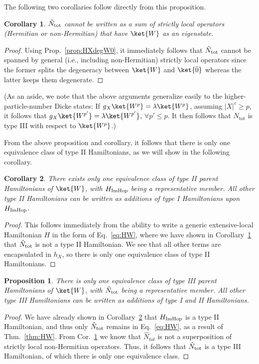 \documentclass[prx,letterpaper,aps,superscriptaddress,floatfix,twocolumn,nofootinbib]{revtex4-2}
\newtheorem{prop}{Proposition}
\newtheorem{cor}{Corollary}
\theoremstyle{definition}
\begin{document}
%
The following two corollaries follow directly from this proposition.
\begin{cor}
    $\hat{N}_{\rm tot}$ cannot be written as a sum of strictly local operators (Hermitian or non-Hermitian) that have $\ket{W}$ as an eigenstate.
\label{cor:Ntotnotnonherm}
\end{cor}
\begin{proof}
    Using Prop.~\ref{prop:HXdegW0}, it immediately follows that $\hat{N}_{\rm tot}$ cannot be spanned by general (i.e., including non-Hermitian) strictly local operators since the former splits the degeneracy between $\ket{W}$ and $\ket{\bar{0}}$ whereas the latter keeps them degenerate.
\end{proof}
%
(As an aside, we note that the above arguments generalize easily to the higher-particle-number Dicke states:
If $g_X \ket{W^p} = \lambda \ket{W^p}$, assuming $|X|^c \geq p$, it follows that $g_X \ket{W^{p'}} = \lambda \ket{W^{p'}}$, $\forall p' \leq p$.
It then follows that $N_{\text{tot}}$ is type III with respect to $\ket{W^p}$.)

%
From the above proposition and corollary, it follows that there is only one equivalence class of type II Hamiltonians, as we will show in the following corollary.
\begin{cor}
    There exists only one equivalence class of type II parent Hamiltonians of $\ket{W}$, 
    with $H_{\rm ImHop}$ being a representative member. All other type II Hamiltonians can be written as additions of type I Hamiltonians upon $H_{\rm ImHop}$.
    \label{cor:equivalenceHII}
\end{cor}
%
\begin{proof}
    This follows immediately from the ability to write a generic extensive-local Hamiltonian $H$ in the form of Eq.~\eqref{eq:HW}, where we have shown in Corollary~\ref{cor:Ntotnotnonherm} that $\hat{N}_{\rm tot}$ is not a type II Hamiltonian.
    We see that all other terms are encapsulated in $h_X$, so there is only one equivalence class of type II Hamiltonians.
\end{proof}
%

%
\begin{prop}
\label{prop:HIIIequive}
    There is only one equivalence class of type III parent Hamiltonians of $\ket{W}$, with $\hat{N}_{\rm tot}$
    being a representative member. All other type III Hamiltonians can be written as additions of type I and II Hamiltonians.
\end{prop}
\begin{proof}
%
We have already shown in Corollary~\ref{cor:equivalenceHII} that $H_{\rm ImHop}$ is a type II Hamiltonian, and thus only $\hat{N}_{\rm tot}$ remains in Eq.~\eqref{eq:HW}, as a result of Thm.~\ref{thm:HW}.
%
From Cor.~\ref{cor:Ntotnotnonherm} we know that $\hat{N}_{tot}$ is not a superposition of strictly local non-Hermitian operators.
%
Thus, it follows that $\hat{N}_{\rm tot}$ is a type III Hamiltonian, of which there is only one equivalence class.
\end{proof}
%
\end{document}
